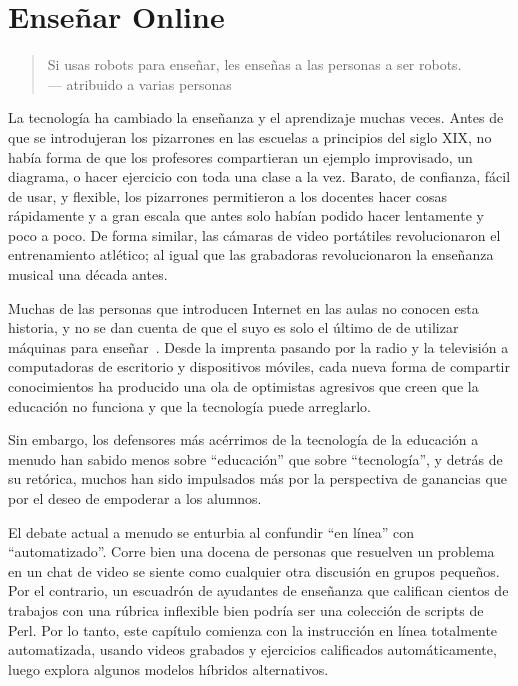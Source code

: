 \chapter{Enseñar Online}\label{s:online}

\begin{quote}

 Si usas robots para enseñar, les enseñas a las personas a ser robots. \\
  --- atribuido a varias personas

\end{quote}

La tecnología ha cambiado la enseñanza y el aprendizaje muchas veces.
Antes de que se introdujeran los pizarrones en las escuelas a principios del siglo XIX,
no había forma de que los profesores compartieran un ejemplo improvisado,
un diagrama,
o hacer ejercicio con toda una clase a la vez.
Barato,
de confianza,
fácil de usar,
y flexible,
los pizarrones permitieron a los docentes hacer cosas rápidamente y a gran escala
que antes solo habían podido hacer lentamente y poco a poco.
De forma similar,
las cámaras de video portátiles revolucionaron el entrenamiento atlético;
al igual que las grabadoras revolucionaron la enseñanza musical una década antes.

Muchas de las personas que introducen Internet en las aulas no conocen esta historia,
y no se dan cuenta de que el suyo es solo el último de  
de utilizar máquinas para enseñar~\cite{Watt2014}.
Desde la imprenta pasando por la radio y la televisión
a computadoras de escritorio y dispositivos móviles,
cada nueva forma de compartir conocimientos ha producido una ola de optimistas agresivos
que creen que la educación no funciona y que la tecnología puede arreglarlo.

Sin embargo,
los defensores más acérrimos de la tecnología de la educación a menudo han sabido menos sobre ``educación'' que sobre ``tecnología'',
y detrás de su retórica,
muchos han sido impulsados más por la perspectiva de ganancias
que por el deseo de empoderar a los alumnos.

El debate actual a menudo se enturbia al confundir ``en línea'' con ``automatizado''.
Corre bien
una docena de personas que resuelven un problema en un chat de video
se siente como cualquier otra discusión en grupos pequeños.
Por el contrario,
un escuadrón de ayudantes de enseñanza que califican cientos de trabajos con una rúbrica inflexible
bien podría ser una colección de scripts de Perl.
Por lo tanto, este capítulo comienza con la instrucción en línea totalmente automatizada,
usando videos grabados y ejercicios calificados automáticamente,
luego explora algunos modelos híbridos alternativos.

